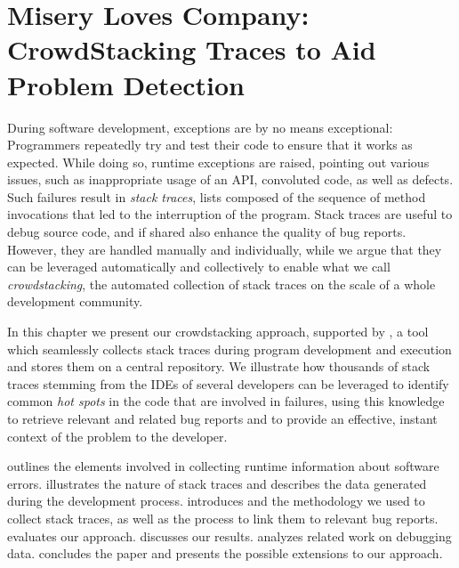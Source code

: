 


\chapter{Misery Loves Company: CrowdStacking Traces to Aid Problem Detection}\label{ch:stacktraces}


During software development, exceptions are by no means exceptional: Programmers repeatedly try and test their code to ensure that it works as expected.
While doing so, runtime exceptions are raised, pointing out various issues, such as inappropriate usage of an API, convoluted code, as well as defects.
Such failures result in \emph{stack traces}, lists composed of the sequence of method invocations that led to the interruption of the program.
Stack traces are useful to debug source code, and if shared also enhance the quality of bug reports.
However, they are handled manually and individually, while we argue that they can be leveraged automatically and collectively to enable what we call \emph{crowdstacking}, the automated collection of stack traces on the scale of a whole development community.

In this chapter we present our crowdstacking approach, supported by \shr, a tool which seamlessly collects stack traces during program development and execution and stores them on a central repository.
We illustrate how thousands of stack traces stemming from the IDEs of several developers can be leveraged to identify common \emph{hot spots} in the code that are involved in failures, using this knowledge to retrieve relevant and related bug reports and to provide an effective, instant context of the problem to the developer.

\structure

 outlines the elements involved in collecting runtime information about software errors.
 illustrates the nature of stack traces and describes the data generated during the development process.
 introduces \shr and the methodology we used to collect stack traces, as well as the process to link them to relevant bug reports.
 evaluates our approach.
 discusses our results.
 analyzes related work on debugging data.
 concludes the paper and presents the possible extensions to our approach.


